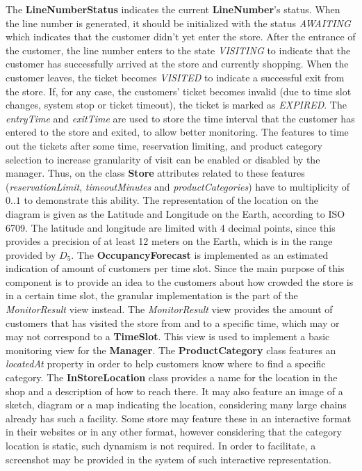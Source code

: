 
The \textbf{LineNumberStatus} indicates the current \textbf{LineNumber}'s status.
When the line number is generated, it should be initialized with the status \textit{AWAITING} which indicates that the customer didn't yet enter the store.
After the entrance of the customer, the line number enters to the state \textit{VISITING} to indicate that the customer has successfully arrived at the store and currently shopping.
When the customer leaves, the ticket becomes \textit{VISITED} to indicate a successful exit from the store.
If, for any case, the customers' ticket becomes invalid (due to time slot changes, system stop or ticket timeout), the ticket is marked as \textit{EXPIRED}.
The \textit{entryTime} and \textit{exitTime} are used to store the time interval that the customer has entered to the store and exited, to allow better monitoring.
The features to time out the tickets after some time, reservation limiting, and product category selection to increase granularity of visit can be enabled or disabled by the manager.
Thus, on the class \textbf{Store} attributes related to these features (\textit{reservationLimit}, \textit{timeoutMinutes} and \textit{productCategories}) have to multiplicity of $0..1$ to demonstrate this ability.
The representation of the location on the diagram is given as the Latitude and Longitude on the Earth, according to ISO 6709.
The latitude and longitude are limited with 4 decimal points, since this provides a precision of at least 12 meters on the Earth, which is in the range provided by $D_{5}$.
The \textbf{OccupancyForecast} is implemented as an estimated indication of amount of customers per time slot.
Since the main purpose of this component is to provide an idea to the customers about how crowded the store is in a certain time slot, the granular implementation is the part of the \textit{MonitorResult} view instead.
The \textit{MonitorResult} view provides the amount of customers that has visited the store from and to a specific time, which may or may not correspond to a \textbf{TimeSlot}.
This view is used to implement a basic monitoring view for the \textbf{Manager}.
The \textbf{ProductCategory} class features an \textit{locatedAt} property in order to help customers know where to find a specific category.
The \textbf{InStoreLocation} class provides a name for the location in the shop and a description of how to reach there.
It may also feature an image of a sketch, diagram or a map indicating the location, considering many large chains already has such a facility.
Some store may feature these in an interactive format in their websites or in any other format, however considering that the category location is static, such dynamism is not required.
In order to facilitate, a screenshot may be provided in the system of such interactive representation.

